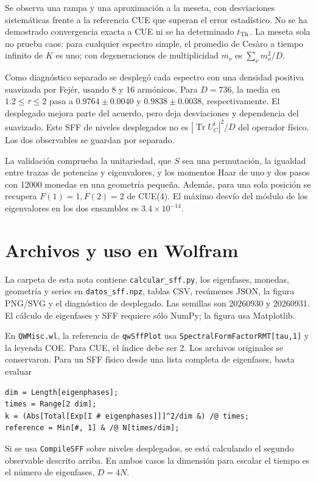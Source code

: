 \documentclass[11pt]{article}
\newcommand{\Tr}{\operatorname{Tr}}
\begin{document}
Se observa una rampa y una aproximación a la meseta, con desviaciones
sistemáticas frente a la referencia CUE que superan el error estadístico.
No se ha demostrado convergencia exacta a CUE ni se ha determinado
$t_{\rm Th}$. La meseta sola no prueba caos: para cualquier espectro
simple, el promedio de Cesàro a tiempo infinito de $K$ es uno;
con degeneraciones de multiplicidad $m_\nu$ es
$\sum_\nu m_\nu^2/D$.

Como diagnóstico separado se desplegó cada espectro con una densidad
positiva suavizada por Fejér, usando 8 y 16 armónicos. Para $D=736$, la
media en $1.2\leq\tau\leq2$ pasa a $0.9764\pm0.0040$ y
$0.9838\pm0.0038$, respectivamente. El desplegado mejora parte del
acuerdo, pero deja desviaciones y dependencia del suavizado. Este
SFF de niveles desplegados no es $|\Tr U_C^t|^2/D$ del operador físico.
Los dos observables se guardan por separado.

La validación comprueba la unitariedad, que $S$ sea una permutación,
la igualdad entre trazas de potencias y eigenvalores, y los momentos
Haar de uno y dos pasos con 12000 monedas en una geometría pequeña.
Además, para una sola posición se recupera $F(1)=1,F(2)=2$ de CUE(4).
El máximo desvío del módulo de los eigenvalores en los dos ensambles
es $3.4\times10^{-14}$.

\section{Archivos y uso en Wolfram}
La carpeta de esta nota contiene \texttt{calcular\_sff.py}, los
eigenfases, monedas, geometría y series en \texttt{datos\_sff.npz},
tablas CSV, resúmenes JSON, la figura PNG/SVG y el diagnóstico de
desplegado. Las semillas son 20260930 y 20260931. El cálculo de
eigenfases y SFF requiere sólo NumPy; la figura usa Matplotlib.

En \texttt{QWMisc.wl}, la referencia de \texttt{qwSffPlot} usa
\texttt{SpectralFormFactorRMT[tau,1]} y la leyenda COE. Para CUE, el
índice debe ser 2. Los archivos originales se conservaron. Para un
SFF físico desde una lista completa de eigenfases, basta evaluar
\begin{verbatim}
dim = Length[eigenphases];
times = Range[2 dim];
k = (Abs[Total[Exp[I # eigenphases]]]^2/dim &) /@ times;
reference = Min[#, 1] & /@ N[times/dim];
\end{verbatim}
Si se usa \texttt{CompileSFF} sobre niveles desplegados, se está
calculando el segundo observable descrito arriba. En ambos casos la
dimensión para escalar el tiempo es el número de eigenfases, $D=4N$.
\end{document}
